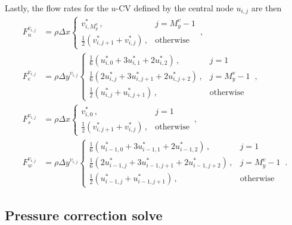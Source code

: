 \documentclass{article}
\begin{document}
Lastly, the flow rates for the $u$-CV defined by the central node $u_{i,j}$ are then
\begin{subequations}
	\begin{align}
		F_n^{v_{i,j}} & = \rho \Delta x \begin{cases}
			v^*_{i, M_y^v}\,, & j = M_y^v - 1 \\
			\frac{1}{2} \left(v^*_{i, j+1} + v^*_{i,j}\right)\,, & \text{otherwise}
		\end{cases}\,, \\
		F_e^{v_{i,j}} & = \rho \Delta y^{v_{i,j}} \begin{cases}
			\frac{1}{6} \left( u^*_{i, 0} + 3 u^*_{i, 1} + 2 u^*_{i, 2} \right)\,, & j = 1 \\
			\frac{1}{6} \left( 2 u^*_{i, j} + 3 u^*_{i, j + 1} + 2 u^*_{i, j + 2} \right)\,, & j = M_y^v - 1 \\
			\frac{1}{2} \left( u^*_{i, j} + u^*_{i, j + 1} \right)\,, & \text{otherwise} 
		\end{cases}\,, \\
		F_s^{v_{i,j}} & = \rho \Delta x \begin{cases}
			v^*_{i, 0}\,, & j = 1 \\
			\frac{1}{2} \left(v^*_{i, j+ 1} + v^*_{i,j}\right)\,, & \text{otherwise}
		\end{cases}\,, \\
		F_w^{v_{i,j}} & = \rho \Delta y^{v_{i,j}} \begin{cases}
			\frac{1}{6} \left( u^*_{i - 1, 0} + 3 u^*_{i - 1, 1} + 2 u^*_{i - 1, 2} \right)\,, & j = 1 \\
			\frac{1}{6} \left( 2 u^*_{i - 1, j} + 3 u^*_{i - 1, j + 1} + 2 u^*_{i - 1, j + 2} \right)\,, & j = M_y^v - 1 \\
			\frac{1}{2} \left( u^*_{i - 1, j} + u^*_{i - 1, j + 1} \right)\,, & \text{otherwise} 
			\end{cases}\,.
	\end{align}
\end{subequations}

\subsection{Pressure correction solve}
\label{subsec:pc-solve}
\end{document}
